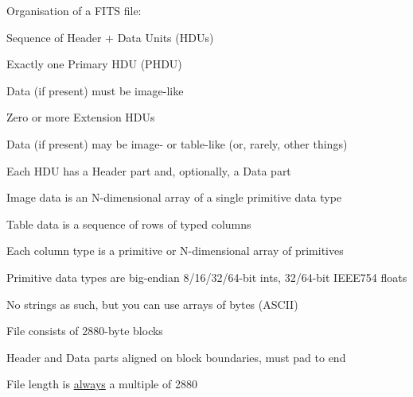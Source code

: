 \documentclass[20pt,landscape]{foils}
\begin{document}
\begin{list0}
  \item Organisation of a FITS file:
  \begin{list2}
    \item Sequence of Header $+$ Data Units (HDUs)
\vspace*{-0.1cm}
    \begin{list3}
      \item Exactly one Primary HDU (PHDU)
      \begin{list4}
        \item Data (if present) must be image-like
      \end{list4}
      \item Zero or more Extension HDUs
      \begin{list4}
        \item Data (if present) may be image- or table-like
              (or, rarely, other things)
      \end{list4}
    \end{list3}
    \item Each HDU has a Header part and, optionally, a Data part
\vspace*{-0.1cm}
    \item Image data is an N-dimensional array of a single primitive data type
\vspace*{-0.1cm}
    \item Table data is a sequence of rows of typed columns 
\vspace*{-0.1cm}
    \begin{list3}
      \item Each column type is a primitive or N-dimensional array of primitives
    \end{list3}
    \item Primitive data types are big-endian 8/16/32/64-bit ints,
                                              32/64-bit IEEE754 floats
\vspace*{-0.1cm}
    \begin{list4}
      \item No strings as such, but you can use arrays of bytes (ASCII)
    \end{list4}
    \item File consists of 2880-byte blocks
\vspace*{-0.1cm}
    \begin{list4}
      \item Header and Data parts aligned on block boundaries, must pad to end
      \item File length is \underline{always} a multiple of 2880

\end{list4}
\end{list2}
\end{list0}
\end{document}
